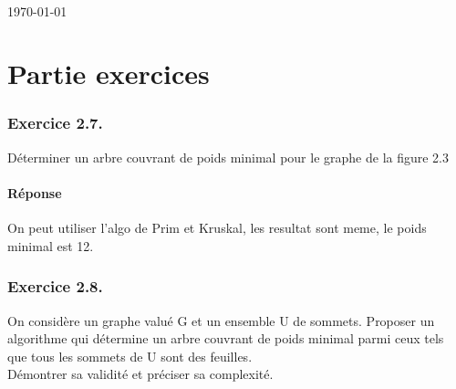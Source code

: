 \documentclass[12pt]{fphw}
\begin{document}
\begin{titlepage}
\begin{minipage}{0.4\textwidth}
\end{minipage}\\[2cm]



{\large \today}\\[2cm] %

\vfill %

\end{titlepage}



\part*{Partie exercices}
\section*{Exercice 2.7.}
\begin{problem}
Déterminer un arbre couvrant de poids minimal pour le graphe de la
figure 2.3
\end{problem}
\subsection*{Réponse}

On peut utiliser l'algo de Prim et Kruskal, les resultat sont meme,
le poids minimal est 12.

\section*{Exercice 2.8.}
\begin{problem}
On considère un graphe valué G et un ensemble U de sommets. Proposer
un algorithme qui détermine un arbre couvrant de poids minimal parmi ceux tels que tous les sommets de U sont des feuilles.\\
Démontrer sa validité et préciser sa complexité.
\end{problem}
\end{document}
